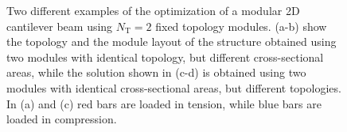 \begin{figure}
    \hspace*{\fill}
    \hfill
    \hspace*{\fill}

    \bigskip

    \hspace*{\fill}
    \hfill
    \hspace*{\fill}
    \caption{Two different examples of the optimization of a modular 2D cantilever beam using $N_\text{T}=2$ fixed topology modules. (a-b) show the topology and the module layout of the structure obtained using two modules with identical topology, but different cross-sectional areas, while the solution shown in (c-d) is obtained using two modules with identical cross-sectional areas, but different topologies. In (a) and (c) red bars are loaded in tension, while blue bars are loaded in compression.}
    \label{fig:06_multiple_fixed}
\end{figure}

